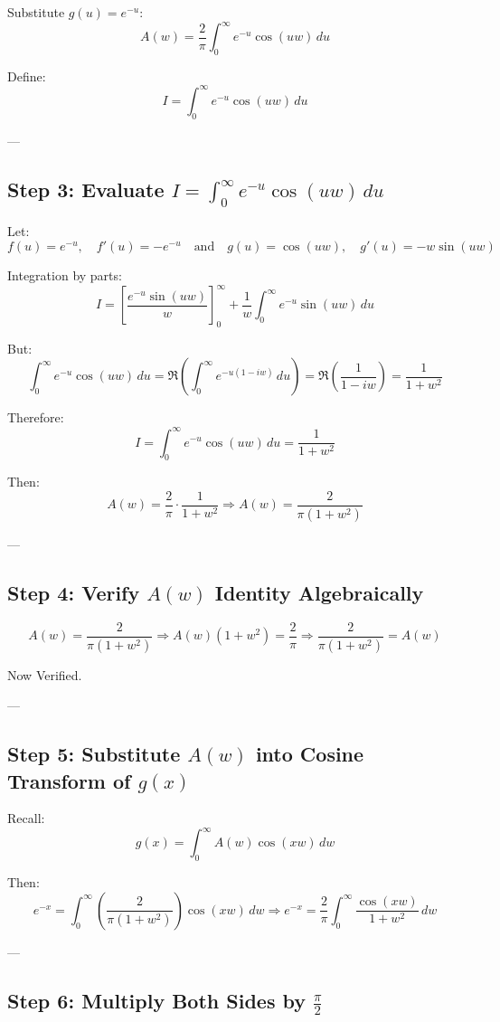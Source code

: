 \documentclass{article}
\begin{document}
Substitute \( g(u) = e^{-u} \):
\[
A(w) = \frac{2}{\pi} \int_0^\infty e^{-u} \cos(uw) \, du
\]

Define:
\[
I = \int_0^\infty e^{-u} \cos(uw) \, du
\]

---

\subsection*{Step 3: Evaluate \( I = \int_0^\infty e^{-u} \cos(uw) \, du \)}

Let:
\[
f(u) = e^{-u}, \quad f'(u) = -e^{-u}
\quad \text{and} \quad
g(u) = \cos(uw), \quad g'(u) = -w \sin(uw)
\]

Integration by parts:
\[
I = \left[ \frac{e^{-u} \sin(uw)}{w} \right]_0^\infty + \frac{1}{w} \int_0^\infty e^{-u} \sin(uw) \, du
\]

But:
\[
\int_0^\infty e^{-u} \cos(uw) \, du = \Re\left( \int_0^\infty e^{-u(1 - iw)} \, du \right)
= \Re\left( \frac{1}{1 - iw} \right)
= \frac{1}{1 + w^2}
\]

Therefore:
\[
I = \int_0^\infty e^{-u} \cos(uw) \, du = \frac{1}{1 + w^2}
\]

Then:
\[
A(w) = \frac{2}{\pi} \cdot \frac{1}{1 + w^2}
\Rightarrow
A(w) = \frac{2}{\pi(1 + w^2)}
\]

---

\subsection*{Step 4: Verify \( A(w) \) Identity Algebraically}

\[
A(w) = \frac{2}{\pi(1 + w^2)} \Rightarrow A(w)(1 + w^2) = \frac{2}{\pi}
\Rightarrow \frac{2}{\pi(1 + w^2)} = A(w)
\]

Now Verified.

---

\subsection*{Step 5: Substitute \( A(w) \) into Cosine Transform of \( g(x) \)}

Recall:
\[
g(x) = \int_0^\infty A(w) \cos(xw) \, dw
\]

Then:
\[
e^{-x} = \int_0^\infty \left( \frac{2}{\pi(1 + w^2)} \right) \cos(xw) \, dw
\Rightarrow
e^{-x} = \frac{2}{\pi} \int_0^\infty \frac{\cos(xw)}{1 + w^2} \, dw
\]

---

\subsection*{Step 6: Multiply Both Sides by \( \frac{\pi}{2} \)}
\end{document}
